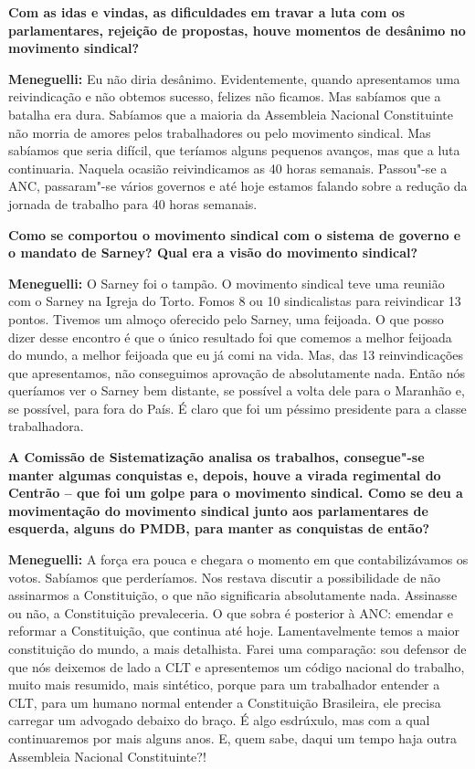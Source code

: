 \textbf{Com as idas e vindas, as dificuldades em travar a luta com os
parlamentares, rejeição de propostas, houve momentos de desânimo no
movimento sindical?}

\textbf{Meneguelli:} Eu não diria desânimo. Evidentemente, quando
apresentamos uma reivindicação e não obtemos sucesso, felizes não
ficamos. Mas sabíamos que a batalha era dura. Sabíamos que a maioria da
Assembleia Nacional Constituinte não morria de amores pelos
trabalhadores ou pelo movimento sindical. Mas sabíamos que seria
difícil, que teríamos alguns pequenos avanços, mas que a luta
continuaria. Naquela ocasião reivindicamos as 40 horas semanais.
Passou"-se a ANC, passaram"-se vários governos e até hoje estamos falando
sobre a redução da jornada de trabalho para 40 horas semanais.

\textbf{Como se comportou o movimento sindical com o sistema de governo
e o mandato de Sarney? Qual era a visão do movimento sindical?}

\textbf{Meneguelli:} O Sarney foi o tampão. O movimento sindical teve
uma reunião com o Sarney na Igreja do Torto. Fomos 8 ou 10 sindicalistas
para reivindicar 13 pontos. Tivemos um almoço oferecido pelo Sarney, uma
feijoada. O que posso dizer desse encontro é que o único resultado foi
que comemos a melhor feijoada do mundo, a melhor feijoada que eu já comi
na vida. Mas, das 13 reinvindicações que apresentamos, não conseguimos
aprovação de absolutamente nada. Então nós queríamos ver o Sarney bem
distante, se possível a volta dele para o Maranhão e, se possível, para
fora do País. É claro que foi um péssimo presidente para a classe
trabalhadora.

\textbf{A Comissão de Sistematização analisa os trabalhos, consegue"-se
manter algumas conquistas e, depois, houve a virada regimental do
Centrão -- que foi um golpe para o movimento sindical. Como se deu a
movimentação do movimento sindical junto aos parlamentares de esquerda,
alguns do PMDB, para manter as conquistas de então?}

\textbf{Meneguelli:} A força era pouca e chegara o momento em que
contabilizávamos os votos. Sabíamos que perderíamos. Nos restava
discutir a possibilidade de não assinarmos a Constituição, o que não
significaria absolutamente nada. Assinasse ou não, a Constituição
prevaleceria. O que sobra é posterior à ANC: emendar e reformar a
Constituição, que continua até hoje. Lamentavelmente temos a maior
constituição do mundo, a mais detalhista. Farei uma comparação: sou
defensor de que nós deixemos de lado a CLT e apresentemos um código
nacional do trabalho, muito mais resumido, mais sintético, porque para
um trabalhador entender a CLT, para um humano normal entender a
Constituição Brasileira, ele precisa carregar um advogado debaixo do
braço. É algo esdrúxulo, mas com a qual continuaremos por mais alguns
anos. E, quem sabe, daqui um tempo haja outra Assembleia Nacional
Constituinte?!

